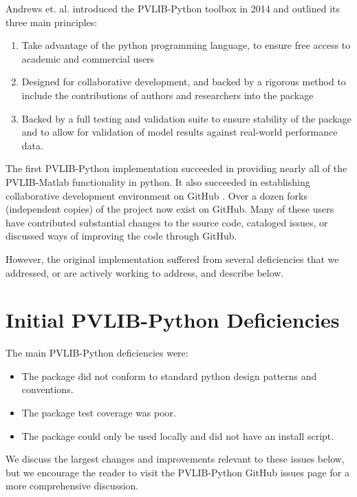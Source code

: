 \documentclass[conference]{IEEEtran}
\begin{document}
Andrews et. al. \cite{andrews} introduced the PVLIB-Python toolbox in 2014 and outlined its three main principles:

\begin{enumerate}
\item Take advantage of the python programming language, to ensure free access to academic and commercial users
\item Designed for collaborative development, and backed by a rigorous method to include the contributions of authors and researchers into the package
\item Backed by a full testing and validation suite to ensure stability of the package and to allow for validation of model results against real-world performance data.
\end{enumerate}

The first PVLIB-Python implementation succeeded in providing nearly all of the PVLIB-Matlab functionality in python.
It also succeeded in establishing collaborative development environment on GitHub \cite{pvlib-github}. 
Over a dozen forks (independent copies) of the project now exist on GitHub. 
Many of these users have contributed substantial changes to the source code, cataloged issues, or discussed ways of improving the code through GitHub.

However, the original implementation suffered from several deficiencies that we addressed, or are actively working to address, and describe below. 



\section{Initial PVLIB-Python Deficiencies}

The main PVLIB-Python deficiencies were:

\begin{itemize}
\item The package did not conform to standard python design patterns and conventions.
\item The package test coverage was poor. 
\item The package could only be used locally and did not have an install script.
\end{itemize}

We discuss the largest changes and improvements relevant to these issues below, but we encourage the reader to visit the PVLIB-Python GitHub issues page for a more comprehensive discussion.
\end{document}
